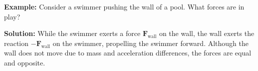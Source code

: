 \textbf{Example:}
Consider a swimmer pushing the wall of a pool. What forces are in play?

\textbf{Solution:}
While the swimmer exerts a force \(\mathbf{F}_{\text{wall}}\) on the wall, the wall exerts the reaction \(-\mathbf{F}_{\text{wall}}\) on the swimmer, propelling the swimmer forward.  
Although the wall does not move due to mass and acceleration differences, the forces are equal and opposite. 

